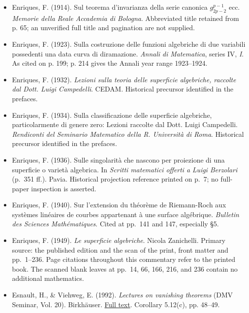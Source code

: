 \begin{sloppypar}
\begin{itemize}
\item Enriques, F. (1914). Sul teorema d'invarianza della serie canonica \(g_{2p-2}^{p-1}\) ecc. \emph{Memorie della Reale Accademia di Bologna}. Abbreviated title retained from p. 65; an unverified full title and pagination are not supplied.

\item Enriques, F. (1923). Sulla costruzione delle funzioni algebriche di due variabili possedenti una data curva di diramazione. \emph{Annali di Matematica}, series IV, \emph{I}. As cited on p. 199; p. 214 gives the Annali year range 1923--1924.

\item Enriques, F. (1932). \emph{Lezioni sulla teoria delle superficie algebriche, raccolte dal Dott. Luigi Campedelli}. CEDAM. Historical precursor identified in the prefaces.

\item Enriques, F. (1934). Sulla classificazione delle superficie algebriche, particolarmente di genere zero: Lezioni raccolte dal Dott. Luigi Campedelli. \emph{Rendiconti del Seminario Matematico della R. Università di Roma}. Historical precursor identified in the prefaces.

\item Enriques, F. (1936). Sulle singolarità che nascono per proiezione di una superficie o varietà algebrica. In \emph{Scritti matematici offerti a Luigi Berzolari} (p.~351 ff.). Pavia. Historical projection reference printed on p.~7; no full-paper inspection is asserted.

\item Enriques, F. (1940). Sur l'extension du théorème de Riemann-Roch aux systèmes linéaires de courbes appartenant à une surface algébrique. \emph{Bulletin des Sciences Mathématiques}. Cited at pp.~141 and 147, especially §5.

\item Enriques, F. (1949). \emph{Le superficie algebriche}. Nicola Zanichelli. Primary source: the published edition and the scan of the print, front matter and pp.~1--236. Page citations throughout this commentary refer to the printed book. The scanned blank leaves at pp.~14, 66, 166, 216, and 236 contain no additional mathematics.

\item Esnault, H., \& Viehweg, E. (1992). \emph{Lectures on vanishing theorems} (DMV Seminar, Vol. 20). Birkh\"auser. \href{https://page.mi.fu-berlin.de/esnault/books/esvibuch.pdf}{Full text}. Corollary 5.12(c), pp. 48--49.


\end{itemize}
\end{sloppypar}
